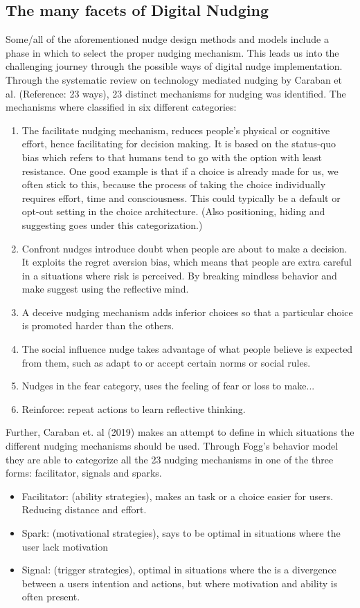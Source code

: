 \subsection{The many facets of Digital Nudging}
Some/all of the aforementioned nudge design methods and models include a phase in which to select the proper nudging mechanism. This leads us into the challenging journey through the possible ways of digital nudge implementation. Through the systematic review on technology mediated nudging by Caraban et al. (Reference: 23 ways), 23 distinct mechanisms for nudging was identified. The mechanisms where classified in six different categories:

\begin{enumerate}
\item The facilitate nudging mechanism, reduces people's physical or cognitive effort, hence facilitating for decision making. It is based on the status-quo bias which refers to that humans tend to go with the option with least resistance. One good example is that if a choice is already made for us, we often stick to this, because the process of taking the choice individually requires effort, time and consciousness. This could typically be a default or opt-out setting in the choice architecture. (Also positioning, hiding and suggesting goes under this categorization.) 
\item Confront nudges introduce doubt when people are about to make a decision. It exploits the regret aversion bias, which means that people are extra careful in a situations where risk is perceived. By breaking mindless behavior and make suggest using the reflective mind. 
\item A deceive nudging mechanism adds inferior choices so that a particular choice is promoted harder than the others. 
\item The social influence nudge takes advantage of what people believe is expected from them, such as adapt to or accept certain norms or social rules. 
\item Nudges in the fear category, uses the feeling of fear or loss to make... 
\item Reinforce: repeat actions to learn reflective thinking. 
\end{enumerate}

Further, Caraban et. al (2019) makes an attempt to define in which situations the different nudging mechanisms should be used. Through Fogg's behavior model they are able to categorize all the 23 nudging mechanisms in one of the three forms: facilitator, signals and sparks.
\begin{itemize}
\item Facilitator: (ability strategies), makes an task or a choice easier for users. Reducing distance and effort. 
\item Spark: (motivational strategies), says to be optimal in situations where the user lack motivation 
\item Signal: (trigger strategies), optimal in situations where the is a divergence between a users intention and actions, but where motivation and ability is often present. 
\end{itemize}

